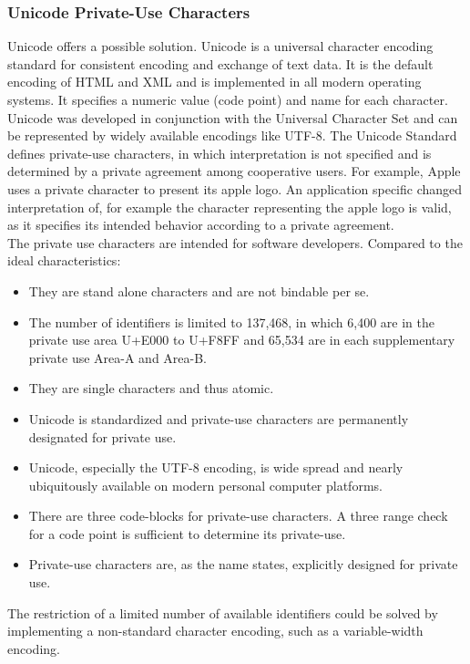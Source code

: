 \subsubsection{Unicode Private-Use Characters}
Unicode \cite{Unicode} offers a possible solution. Unicode is a universal character encoding standard for consistent encoding and exchange of text data. It is the default encoding of HTML and XML and is implemented in all modern operating systems. It specifies a numeric value (code point) and name for each character. Unicode was developed in conjunction with the Universal Character Set and can be represented by widely available encodings like UTF-8. The Unicode Standard defines private-use characters, in which interpretation is not specified and is determined by a private agreement among cooperative users. For example, Apple uses a private character to present its apple logo. An application specific changed interpretation of, for example the character representing the apple logo is valid, as it specifies its intended behavior according to a private agreement.\\ 
The private use characters are intended for software developers. Compared to the ideal characteristics:
\begin{itemize}
	\item They are stand alone characters and are not bindable per se.
	\item The number of identifiers is limited to 137,468, in which 6,400 are in the private use area U+E000 to U+F8FF and 65,534 are in each supplementary private use Area-A and Area-B. 
	\item They are single characters and thus atomic. 
	\item Unicode is standardized and private-use characters are permanently designated for private use.
	\item Unicode, especially the UTF-8 encoding, is wide spread and nearly ubiquitously available on modern personal computer platforms.
	\item There are three code-blocks for private-use characters. A three range check for a code point is sufficient to determine its private-use.
	\item Private-use characters are, as the name states, explicitly designed for private use.
\end{itemize}
The restriction of a limited number of available identifiers could be solved by implementing a non-standard character encoding, such as a variable-width encoding.



